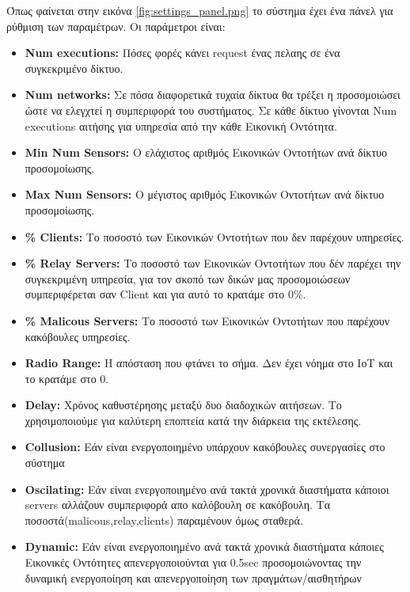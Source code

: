 Όπως φαίνεται στην εικόνα \ref{fig:settings_panel.png} το σύστημα έχει ένα πάνελ για ρύθμιση των παραμέτρων. Οι παράμετροι είναι:
\begin{itemize}
\item \textbf{Num executions:} Πόσες φορές κάνει request ένας πελαης σε ένα συγκεκριμένο δίκτυο.
\item \textbf{Num networks:} Σε πόσα διαφορετικά τυχαία δίκτυα θα τρέξει η προσομοιώσει ώστε να ελεγχτεί η συμπεριφορά του συστήματος. Σε κάθε δίκτυο γίνονται Num executions αιτήσης για υπηρεσία από την κάθε Εικονική Οντότητα.
\item \textbf{Min Num Sensors:} O ελάχιστος αριθμός Εικονικών Οντοτήτων ανά δίκτυο προσομοίωσης.
\item \textbf{Μax Num Sensors:} O μέγιστος αριθμός Εικονικών Οντοτήτων ανά δίκτυο προσομοίωσης.

\item \textbf{\% Clients:} Το ποσοστό των Εικονικών Οντοτήτων που δεν παρέχουν  υπηρεσίες.

\item \textbf{\% Relay Servers:} Το ποσοστό των Εικονικών Οντοτήτων που δέν παρέχει την συγκεκριμένη υπηρεσία, για τον σκοπό των δικών μας προσομοιώσεων συμπεριφέρεται σαν Client και για αυτό το κρατάμε στο 0\%.

\item \textbf{\% Malicous Servers:} Το ποσοστό των Εικονικών Οντοτήτων που παρέχουν κακόβουλες υπηρεσίες.

\item \textbf{Radio Range:} Η απόσταση που φτάνει το σήμα. Δεν έχει νόημα στο ΙοΤ και το κρατάμε στο 0.

\item \textbf{Delay:} Χρόνος καθυστέρησης μεταξύ δυο διαδοχικών αιτήσεων. Το χρησιμοποιούμε για καλύτερη εποπτεία κατά την διάρκεια της εκτέλεσης.

\item \textbf{Collusion:} Εάν είναι ενεργοποιημένο υπάρχουν κακόβουλες συνεργασίες στο σύστημα

\item \textbf{Oscilating:} Εάν είναι ενεργοποιημένο ανά τακτά χρονικά διαστήματα κάποιοι servers αλλάζουν συμπεριφορά απο καλόβουλη σε κακόβουλη. Τα ποσοστά(malicous,relay,clients) παραμένουν όμως σταθερά.

\item \textbf{Dynamic:} Εάν είναι ενεργοποιημένο ανά τακτά χρονικά διαστήματα κάποιες Εικονικές Οντότητες απενεργοποιούνται για 0.5sec προσομοιώνοντας την δυναμική ενεργοποίηση και απενεργοποίηση των πραγμάτων/αισθητήρων
\end{itemize}
\newpage
{}


